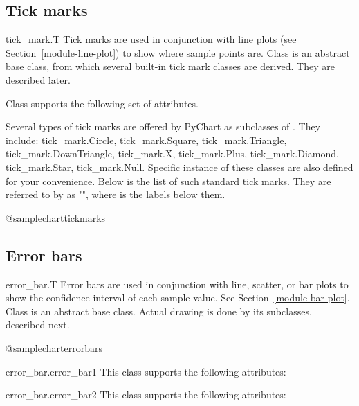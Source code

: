 \documentclass{howto}
\newcommand{\pychart}{PyChart}
\newcommand{\xref}[1]{See Section~\ref{#1}}
\newcommand{\pxref}[1]{see Section~\ref{#1}}
\begin{document}
\subsection{Tick marks}

\begin{classdesc*}{tick_mark.T}
Tick marks are used in conjunction with line plots (\pxref{module-line-plot})
to show where sample points are.
Class  is an abstract base class, from which
several built-in tick mark classes are derived. They are described later.
\end{classdesc*}

Class  supports the following set of attributes.


Several types of tick marks are offered by \pychart{} as subclasses of
.  They include: tick_mark.Circle,
tick_mark.Square, tick_mark.Triangle, tick_mark.DownTriangle,
tick_mark.X, tick_mark.Plus, tick_mark.Diamond, tick_mark.Star,
tick_mark.Null.  Specific instance of these classes are also defined for
your convenience.  Below is the list of such standard tick marks.  They
are referred to by as "", where  is
the labels below them.

@samplechart{tickmarks}

\subsection{Error bars}


\begin{classdesc*}{error_bar.T}
Error bars are used in conjunction with line, scatter, or bar plots to
show the confidence interval of each sample value. \xref{module-bar-plot}.
Class  is an abstract base class. Actual drawing is
done by its subclasses, described next.
\end{classdesc*}

@samplechart{errorbars}


\begin{classdesc*}{error_bar.error_bar1}
This class supports the following attributes:
\end{classdesc*}

\begin{classdesc*}{error_bar.error_bar2}
This class supports the following attributes:
\end{classdesc*}
\end{document}
